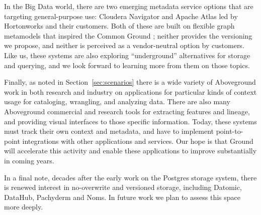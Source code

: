 \documentclass{sig-alternate}
\begin{document}
In the Big Data world, there are two emerging metadata service options that are targeting general-purpose use: Cloudera Navigator and Apache Atlas led by Hortonworks and their customers. Both of these are built on flexible graph metamodels that inspired the Common Ground \mantle; neither provides the \core versioning  we propose, and neither is perceived as a vendor-neutral option by customers.  Like us, these systems are also exploring ``underground'' alternatives for storage and querying, and we look forward to learning more from them on those topics. 


Finally, as noted in Section~\ref{sec:scenarios} there is a wide variety of Aboveground work in both research and industry on applications for particular kinds of context usage for cataloging, wrangling, and analyzing data. There are also many Aboveground commercial and research tools for extracting features and lineage, and providing visual interfaces to those specific information.
Today, these systems must track their own context and metadata, and have to implement point-to-point integrations with other applications and services. Our hope is that Ground will accelerate this activity and enable these applications to improve substantially in coming years.

In a final note, decades after the early work on the Postgres storage system, there is renewed interest in no-overwrite and versioned storage, including Datomic, DataHub, Pachyderm and Noms. In future work we plan to assess this space more deeply.

\end{document}
